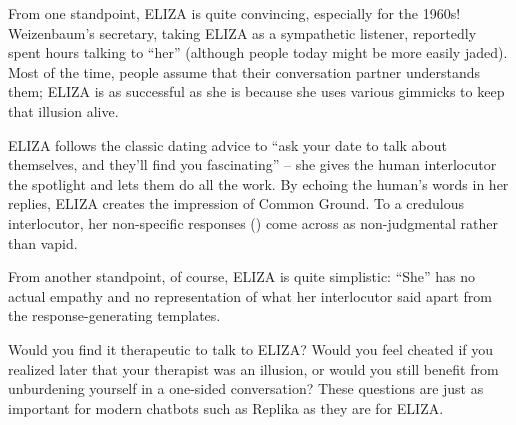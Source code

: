 From one standpoint, ELIZA is quite convincing, especially for the 1960s!  Weizenbaum's secretary, taking ELIZA as a sympathetic listener, reportedly spent hours talking to ``her'' (although people today might be more easily jaded).  Most of the time, people assume that their conversation partner understands them; ELIZA is as successful as she is because she uses various gimmicks to keep that illusion alive.   

ELIZA follows the classic dating advice to ``ask your date to talk about themselves, and they'll find you fascinating'' --  she gives the human interlocutor the spotlight and lets them do all the work.   By echoing the human's words in her replies, ELIZA creates the impression of Common Ground.  To a credulous interlocutor, her non-specific responses ()  come across as non-judgmental rather than vapid.  

From another standpoint, of course, ELIZA is quite simplistic: ``She''  has no actual empathy and no representation of what her interlocutor said apart from the response-generating templates.

Would you find it therapeutic to talk to ELIZA?  Would you feel cheated if you realized later that your therapist was an illusion, or would you still benefit from unburdening yourself in a one-sided conversation?  These questions are just as important for modern chatbots such as Replika as they are for ELIZA.





